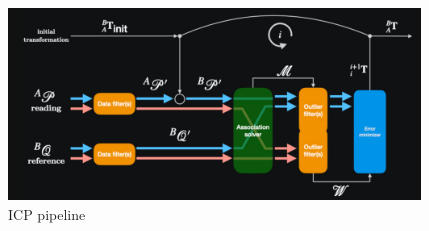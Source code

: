 
\begin{figure} [htpb]
	\centering
	\includegraphics[height=2.0in]{figs/icp_pipeline.pdf}
	\caption{ICP pipeline}
	\label{fig:icp_pipeline}
\end{figure}



